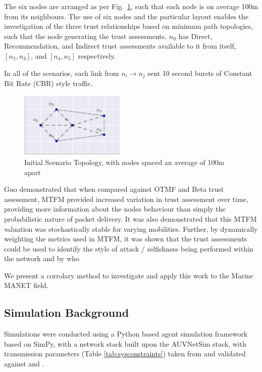 \documentclass[runningheads,a4paper]{llncs}
\begin{document}
The six nodes are arranged as per Fig.~\ref{fig:s1_layout}, such that each node is on average 100m from its neighbours. 
The use of six nodes and the particular layout enables the investigation of the three trust relationships based on minimum path topologies, such that the node generating the trust assessments, $n_0$ has Direct, Recommendation, and Indirect trust assessments available to it from itself, $[n_2,n_3]$, and $[n_4,n_5]$ respectively.

In all of the scenarios, each link from $n_i \rightarrow n_j$ sent 10 second bursts of Constant Bit Rate (CBR) style traffic.

\begin{figure}[h]
  \centering
  \includegraphics[width=0.45\textwidth]{img/s1_layout.pdf}
  \caption{Initial Scenario Topology, with nodes spaced an average of 100m apart}
  \label{fig:s1_layout}
\end{figure}

Guo demonstrated that when compared against OTMF and Beta trust assessment, MTFM provided increased variation in trust assessment over time, providing more information about the nodes behaviour than simply the probabilistic nature of packet delivery. 
It was also demonstrated that this MTFM valuation was stochastically stable for varying mobilities.
Further, by dynamically weighting the metrics used in MTFM, it was shown that the trust assessments could be used to identify the style of attack / selfishness being performed within the network and by who

We present a corrolary method to investigate and apply this work to the Marine MANET field.

\subsection{Simulation Background}

Simulations were conducted using a Python based agent simulation framework based on SimPy\cite{Mueller2003SimPy}, with a network stack built upon the AUVNetSim stack\cite{Miquel2008}, with transmission parameters (Table \ref{tab:sysconstraints}) taken from and validated against \cite{Stojanovic2007} and \cite{Stefanov2011}.
\end{document}
